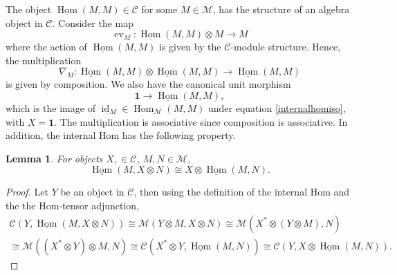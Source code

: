 \documentclass[11pt]{book}
\newtheorem{Lem}[theorem]{Lemma}
\theoremstyle{Rem}
\theoremstyle{definition}
\numberwithin{equation}{section}
\newcommand\id{\operatorname{id}}
\newcommand\ot{\otimes}
\newcommand\Hom{\operatorname{Hom}}
\newcommand\M{\mathcal{M}}
\newcommand\C{\mathcal C}
\newcommand\one{\mathbf{1}}
\newcommand\ev{\operatorname{ev}}
\begin{document}
The object $\underline{\Hom} (M, M)\in \C$ for some $M\in\M$, has the structure of an algebra object in $\C$. Consider the map \begin{equation}
	\ev_M: \underline{\Hom} (M, M) \otimes M \rightarrow M
\end{equation} where the action of $\underline{\Hom} (M, M)$ is given by the $\C$-module structure. Hence, the multiplication \begin{equation}
\nabla_M:	\underline{\Hom} (M, M)\otimes \underline{\Hom} (M, M) \rightarrow \underline{\Hom} (M, M)
\end{equation} is given by composition. We also have the canonical unit morphism \begin{equation}
	\one\rightarrow \underline{\Hom}(M,M),                                                  
\end{equation}which is the image of $\id_M\in \Hom_\M(M, M)$ under equation \ref{internalhomiso}, with $X=\one$. 
The multiplication is associative since composition is associative. 
In addition, the internal Hom has the following property.
\begin{Lem}\label{internalhomlemma}
For objects $X,\in \C$, $ M, N\in \M$,
\begin{equation}
\underline{\Hom}(M, X\otimes N) \cong X \otimes \underline{\Hom}(M, N).
\end{equation}
\end{Lem}
\begin{proof}
Let $Y$ be an object in $\C$, then using the definition of the internal Hom and the the Hom-tensor adjunction, \begin{align}
	\C(Y, \underline{\Hom}(M, X\ot N)) \cong \M(Y\ot M,  X\ot N) \cong \M(X^* \ot (Y\ot M),  N) \\
	\cong \M((X^* \ot Y)\ot M,  N) \cong \C(X^* \ot Y, \underline{\Hom}( M,  N)) \cong \C(Y, X\ot \underline{\Hom}(M,  N)).
\end{align} 
\end{proof}
\end{document}
